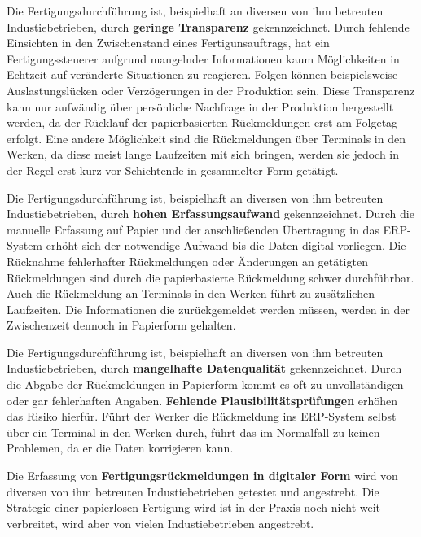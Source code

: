 \begin{definitionForm}[KA-P-2]
Die Fertigungsdurchführung ist, beispielhaft an diversen von ihm betreuten Industiebetrieben, durch \textbf{geringe Transparenz} gekennzeichnet. Durch fehlende Einsichten in den Zwischenstand eines Fertigunsauftrags, hat ein Fertigungssteuerer aufgrund mangelnder Informationen kaum Möglichkeiten in Echtzeit auf veränderte Situationen zu reagieren. Folgen können beispielsweise Auslastungslücken oder Verzögerungen in der Produktion sein. Diese Transparenz kann nur aufwändig über persönliche Nachfrage in der Produktion hergestellt werden, da der Rücklauf der papierbasierten Rückmeldungen erst am Folgetag erfolgt. Eine andere Möglichkeit sind die Rückmeldungen über Terminals in den Werken, da diese meist lange Laufzeiten mit sich bringen, werden sie jedoch in der Regel erst kurz vor Schichtende in gesammelter Form getätigt. 
\end{definitionForm}

\begin{definitionForm}[KA-P-3]
Die Fertigungsdurchführung ist, beispielhaft an diversen von ihm betreuten Industiebetrieben, durch \textbf{hohen Erfassungsaufwand} gekennzeichnet. Durch die manuelle Erfassung auf Papier und der anschließenden Übertragung in das ERP-System erhöht sich der notwendige Aufwand bis die Daten digital vorliegen. Die Rücknahme fehlerhafter Rückmeldungen oder Änderungen an getätigten Rückmeldungen sind durch die papierbasierte Rückmeldung schwer durchführbar. Auch die Rückmeldung an Terminals in den Werken führt zu zusätzlichen Laufzeiten. Die Informationen die zurückgemeldet werden müssen, werden in der Zwischenzeit dennoch in Papierform gehalten. 
\end{definitionForm}

\begin{definitionForm}[KA-P-4]
Die Fertigungsdurchführung ist, beispielhaft an diversen von ihm betreuten Industiebetrieben, durch \textbf{mangelhafte Datenqualität} gekennzeichnet. Durch die Abgabe der Rückmeldungen in Papierform kommt es oft zu unvollständigen oder gar fehlerhaften Angaben. \textbf{Fehlende Plausibilitätsprüfungen} erhöhen das Risiko hierfür. Führt der Werker die Rückmeldung ins ERP-System selbst über ein Terminal in den Werken durch, führt das im Normalfall zu keinen Problemen, da er die Daten korrigieren kann. 
\end{definitionForm}

\begin{definitionForm}[KA-P-5]
Die Erfassung von \textbf{Fertigungsrückmeldungen in digitaler Form} wird von diversen von ihm betreuten Industiebetrieben getestet und angestrebt. Die Strategie einer papierlosen Fertigung wird ist in der Praxis noch nicht weit verbreitet, wird aber von vielen Industiebetrieben angestrebt.
\end{definitionForm}

